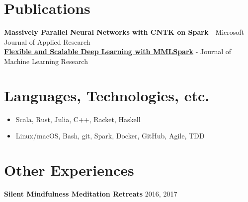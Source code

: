 \documentclass[overlapped]{res}
\begin{document}
\begin{resume}


    \section{Publications}
        {\bf Massively Parallel Neural Networks with CNTK on Spark} - Microsoft Journal of Applied Research \\
        {\bf \href{https://arxiv.org/pdf/1804.04031.pdf}{\underline{Flexible and Scalable Deep Learning with MMLSpark}}} - Journal of Machine Learning Research

    \section{Languages, Technologies, etc.}
    \begin{itemize} \itemsep-2pt
        \item
            Scala, Rust, Julia, C++, Racket, Haskell
        \item
            Linux/macOS, Bash, git, Spark, Docker, GitHub, Agile, TDD
    \end{itemize}

    \section{Other Experiences}

    {\bf Silent Mindfulness Meditation Retreats} \hfill 2016, 2017

\end{resume}
\end{document}
